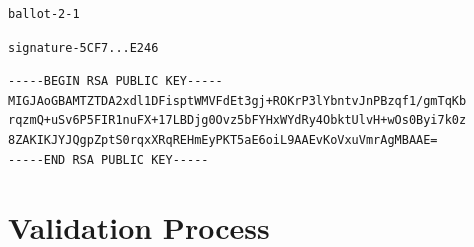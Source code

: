 \documentclass[12pt]{article}
\begin{document}
\begin{verbatim}
ballot-2-1
\end{verbatim}

\begin{verbatim}
signature-5CF7...E246
\end{verbatim}

\begin{verbatim}
-----BEGIN RSA PUBLIC KEY-----
MIGJAoGBAMTZTDA2xdl1DFisptWMVFdEt3gj+ROKrP3lYbntvJnPBzqf1/gmTqKb
rqzmQ+uSv6P5FIR1nuFX+17LBDjg0Ovz5bFYHxWYdRy4ObktUlvH+wOs0Byi7k0z
8ZAKIKJYJQgpZptS0rqxXRqREHmEyPKT5aE6oiL9AAEvKoVxuVmrAgMBAAE=
-----END RSA PUBLIC KEY-----
\end{verbatim}

\section{Validation Process}
\end{document}
